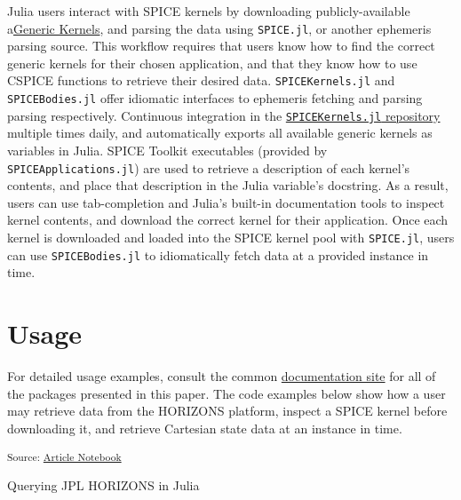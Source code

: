 \documentclass[
]{article}
\begin{document}
Julia users interact with SPICE kernels by downloading
publicly-available
a\href{https://naif.jpl.nasa.gov/pub/naif/generic_kernels/}{Generic
Kernels}, and parsing the data using \texttt{SPICE.jl}, or another
ephemeris parsing source. This workflow requires that users know how to
find the correct generic kernels for their chosen application, and that
they know how to use CSPICE functions to retrieve their desired data.
\texttt{SPICEKernels.jl} and \texttt{SPICEBodies.jl} offer idiomatic
interfaces to ephemeris fetching and parsing parsing respectively.
Continuous integration in the
\href{https://github.com/cadojo/SPICEKernels.jl}{\texttt{SPICEKernels.jl}
repository} multiple times daily, and automatically exports all
available generic kernels as variables in Julia. SPICE Toolkit
executables (provided by \texttt{SPICEApplications.jl}) are used to
retrieve a description of each kernel's contents, and place that
description in the Julia variable's docstring. As a result, users can
use tab-completion and Julia's built-in documentation tools to inspect
kernel contents, and download the correct kernel for their application.
Once each kernel is downloaded and loaded into the SPICE kernel pool
with \texttt{SPICE.jl}, users can use \texttt{SPICEBodies.jl} to
idiomatically fetch data at a provided instance in time.

\section{Usage}\label{sec-usage}

For detailed usage examples, consult the common
\href{https://ephemeris.loopy.codes}{documentation site} for all of the
packages presented in this paper. The code examples below show how a
user may retrieve data from the HORIZONS platform, inspect a SPICE
kernel before downloading it, and retrieve Cartesian state data at an
instance in time.

\textsubscript{Source:
\href{https://cadojo.github.io/ephemeris.loopy.codes/index.qmd.html}{Article
Notebook}}

\begin{codelisting}

\caption{\label{lst-horizons-fetching}Querying JPL HORIZONS in Julia}


\end{codelisting}%
\end{document}
